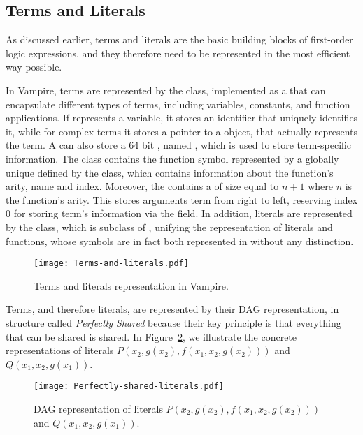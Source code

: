 \subsection{Terms and Literals}\label{subsec:terms-and-literals}

As discussed earlier, terms and literals are the basic building blocks of first-order logic expressions, and they therefore need to be represented in the most efficient way possible.

In Vampire, terms are represented by the  class, implemented as a  that can encapsulate different types of terms, including variables, constants, and function applications.
If  represents a variable, it stores an  identifier that uniquely identifies it, while for complex terms it stores a pointer to a  object, that actually represents the term.
A  can also store a 64 bit , named , which is used to store term-specific information.
The  class contains the function symbol represented by a globally unique  defined by the  class, which contains information about the function's arity, name and index.
Moreover, the  contains a  of size equal to \(n+1\) where \(n\) is the function's arity.
This  stores arguments term from right to left, reserving index \(0\) for storing term's information via the  field.
In addition, literals are represented by the  class, which is subclass of , unifying the representation of literals and functions, whose symbols are in fact both represented in  without any distinction.

\begin{figure}[htbp]
  \centering
  \texttt{[image: Terms-and-literals.pdf]}
  \caption{Terms and literals representation in Vampire.}\label{fig:terms-representation}
\end{figure}

Terms, and therefore literals, are represented by their DAG representation, in structure called \emph{Perfectly Shared} because their key principle is that everything that can be shared is shared.
In Figure~\ref{fig:dag_representation}, we illustrate the concrete representations of literals \(P(x_2,g(x_2),f(x_1,x_2,g(x_2)))\) and \(Q(x_1,x_2,g(x_1))\).

\begin{figure}[htbp]
  \centering
  \texttt{[image: Perfectly-shared-literals.pdf]}
  \caption{DAG representation of literals \(P(x_2,g(x_2),f(x_1,x_2,g(x_2)))\) and \(Q(x_1,x_2,g(x_1))\).}\label{fig:dag_representation}

\end{figure}

